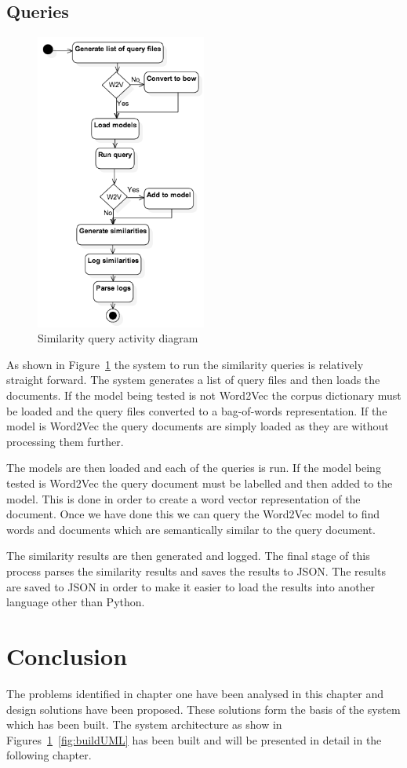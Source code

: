 \subsection{Queries}
\begin{figure}[h]
    \centering
        \includegraphics[width=0.5\textwidth]{Figures/ArchictectureQueryUML.png}
    \caption{Similarity query activity diagram}
    \label{fig:queryUML}
\end{figure}
As shown in Figure~\ref{fig:queryUML} the system to run the similarity queries is relatively straight forward.
The system generates a list of query files and then loads the documents.
If the model being tested is not Word2Vec the corpus dictionary must be loaded and the query files converted to a bag-of-words representation.
If the model is Word2Vec the query documents are simply loaded as they are without processing them further.

The models are then loaded and each of the queries is run.
If the model being tested is Word2Vec the query document must be labelled and then added to the model.
This is done in order to create a word vector representation of the document.
Once we have done this we can query the Word2Vec model to find words and documents which are semantically similar to the query document.

The similarity results are then generated and logged.
The final stage of this process parses the similarity results and saves the results to JSON.
The results are saved to JSON in order to make it easier to load the results into another language other than Python.

\section{Conclusion}
The problems identified in chapter one have been analysed in this chapter and design solutions have been proposed.
These solutions form the basis of the system which has been built.
The system architecture as show in Figures~\ref{fig:queryUML}~\ref{fig:buildUML} has been built and will be presented in detail in the following chapter.
